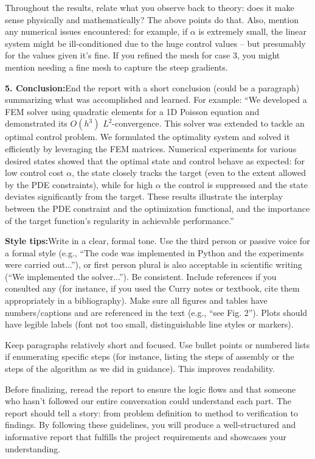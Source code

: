 \documentclass[a4paper,10pt]{article}
\begin{document}
Throughout the results, relate what you observe back to theory: does it make sense physically and mathematically? The above points do that. Also, mention any numerical issues encountered: for example, if \(\alpha\) is extremely small, the linear system might be ill-conditioned due to the huge control values – but presumably for the values given it's fine. If you refined the mesh for case 3, you might mention needing a fine mesh to capture the steep gradients.

\textbf{5. Conclusion:}End the report with a short conclusion (could be a paragraph) summarizing what was accomplished and learned. For example: “We developed a FEM solver using quadratic elements for a 1D Poisson equation and demonstrated its \(O(h^3)\) \(L^2\)-convergence. This solver was extended to tackle an optimal control problem. We formulated the optimality system and solved it efficiently by leveraging the FEM matrices. Numerical experiments for various desired states showed that the optimal state and control behave as expected: for low control cost \(\alpha\), the state closely tracks the target (even to the extent allowed by the PDE constraints), while for high \(\alpha\) the control is suppressed and the state deviates significantly from the target. These results illustrate the interplay between the PDE constraint and the optimization functional, and the importance of the target function's regularity in achievable performance.”

\textbf{Style tips:}Write in a clear, formal tone. Use the third person or passive voice for a formal style (e.g., “The code was implemented in Python and the experiments were carried out...”), or first person plural is also acceptable in scientific writing (“We implemented the solver...”). Be consistent. Include references if you consulted any (for instance, if you used the Curry notes or textbook, cite them appropriately in a bibliography). Make sure all figures and tables have numbers/captions and are referenced in the text (e.g., “see Fig. 2”). Plots should have legible labels (font not too small, distinguishable line styles or markers).

Keep paragraphs relatively short and focused. Use bullet points or numbered lists if enumerating specific steps (for instance, listing the steps of assembly or the steps of the algorithm as we did in guidance). This improves readability.

Before finalizing, reread the report to ensure the logic flows and that someone who hasn't followed our entire conversation could understand each part. The report should tell a story: from problem definition to method to verification to findings. By following these guidelines, you will produce a well-structured and informative report that fulfills the project requirements and showcases your understanding.
\end{document}
